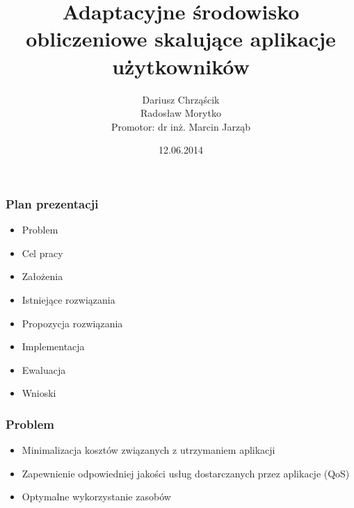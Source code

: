 \documentclass{beamer}
\title[]{Adaptacyjne środowisko obliczeniowe skalujące aplikacje użytkowników}
\author[D. Chrząścik, R. Morytko]{Dariusz Chrząścik\\
Radosław Morytko\\
Promotor: dr inż. Marcin Jarząb}
\date[2014]{12.06.2014}
\institute[AGH]
{Informatyka\\ 
Wydział Informatyki, Elektroniki i Telekomunikacji
}
\begin{document}
{
 \begin{frame}
   \titlepage
 \end{frame}
}


\begin{frame}
\frametitle{Plan prezentacji}

\begin{itemize}
	\item Problem
	\item Cel pracy
	\item Założenia
	\item Istniejące rozwiązania
	\item Propozycja rozwiązania
	\item Implementacja
	\item Ewaluacja
	\item Wnioski
\end{itemize}

\end{frame}



\begin{frame}
\frametitle{Problem}

\begin{itemize}
\item Minimalizacja kosztów związanych z utrzymaniem aplikacji
\item Zapewnienie odpowiedniej jakości usług dostarczanych przez aplikacje (QoS)
\item Optymalne wykorzystanie zasobów
\end{itemize}

\end{frame}
\end{document}
